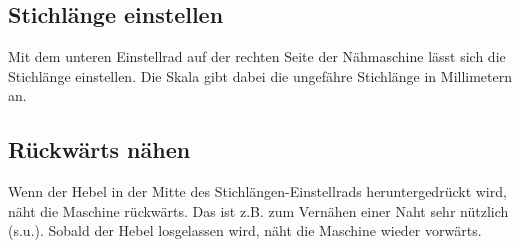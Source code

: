 \documentclass{\basedir/fablab-document}
\begin{document}
\subsection{Stichlänge einstellen}
Mit dem unteren Einstellrad auf der rechten Seite der Nähmaschine lässt sich die Stichlänge einstellen. Die Skala gibt dabei die ungefähre Stichlänge in Millimetern an.

\subsection{Rückwärts nähen}
Wenn der Hebel in der Mitte des Stichlängen-Einstellrads heruntergedrückt wird, näht die Maschine rückwärts. Das ist z.B. zum Vernähen einer Naht sehr nützlich (s.u.).
Sobald der Hebel losgelassen wird, näht die Maschine wieder vorwärts.
\end{document}
